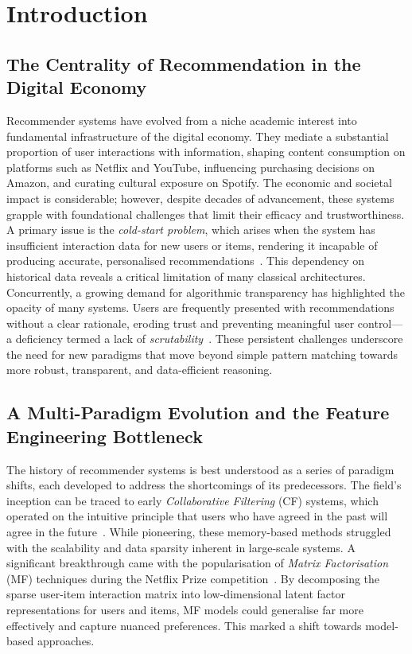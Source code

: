 \doublespacing

\chapter{Introduction}
\label{ch:intro}

\section{The Centrality of Recommendation in the Digital Economy}
\label{sec:intro_motivation}

Recommender systems have evolved from a niche academic interest into fundamental infrastructure of the digital economy. They mediate a substantial proportion of user interactions with information, shaping content consumption on platforms such as Netflix and YouTube, influencing purchasing decisions on Amazon, and curating cultural exposure on Spotify. The economic and societal impact is considerable; however, despite decades of advancement, these systems grapple with foundational challenges that limit their efficacy and trustworthiness. A primary issue is the \textit{cold-start problem}, which arises when the system has insufficient interaction data for new users or items, rendering it incapable of producing accurate, personalised recommendations~\cite{Schein2002ColdStart}. This dependency on historical data reveals a critical limitation of many classical architectures. Concurrently, a growing demand for algorithmic transparency has highlighted the opacity of many systems. Users are frequently presented with recommendations without a clear rationale, eroding trust and preventing meaningful user control—a deficiency termed a lack of \textit{scrutability}~\cite{Tintarev2011Explainable}. These persistent challenges underscore the need for new paradigms that move beyond simple pattern matching towards more robust, transparent, and data-efficient reasoning.

\section{A Multi-Paradigm Evolution and the Feature Engineering Bottleneck}
\label{sec:intro_evolution}

The history of recommender systems is best understood as a series of paradigm shifts, each developed to address the shortcomings of its predecessors. The field's inception can be traced to early \textit{Collaborative Filtering} (CF) systems, which operated on the intuitive principle that users who have agreed in the past will agree in the future~\cite{Resnick1994GroupLens}. While pioneering, these memory-based methods struggled with the scalability and data sparsity inherent in large-scale systems. A significant breakthrough came with the popularisation of \textit{Matrix Factorisation} (MF) techniques during the Netflix Prize competition~\cite{Koren2009MatrixFactorization}. By decomposing the sparse user-item interaction matrix into low-dimensional latent factor representations for users and items, MF models could generalise far more effectively and capture nuanced preferences. This marked a shift towards model-based approaches.


